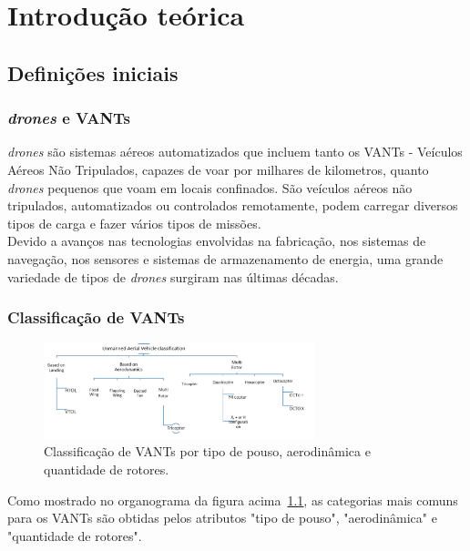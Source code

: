 \documentclass[12pt,a4paper,oneside]{book}
\begin{document}
%

\chapter{Introdução teórica}
%
\thispagestyle{empty} 
%


\section{Definições iniciais}

\subsection{\textit{drones} e VANTs}
\textit{drones} são sistemas aéreos automatizados que incluem tanto os VANTs - Veículos Aéreos Não Tripulados, capazes de voar por milhares de 
kilometros, quanto \textit{drones} pequenos que voam em locais confinados. São veículos aéreos não tripulados, automatizados ou controlados 
remotamente, podem carregar diversos tipos de carga e fazer vários tipos de missões.\\
Devido a avanços nas tecnologias envolvidas na fabricação, nos sistemas de navegação, nos sensores e sistemas de armazenamento de 
energia, uma grande variedade de tipos de \textit{drones} surgiram nas últimas décadas. 

\subsection{Classificação de VANTs}

\begin{figure}[!htbp]
  \centering
  \includegraphics[width=0.7\textwidth]{Images/introducao/drone_classification.png}
  \caption{Classificação de VANTs por tipo de pouso, aerodinâmica e quantidade de rotores.}
  \label{fig:drone_classification.png}
\end{figure}

Como mostrado no organograma da figura acima~\ref{fig:drone_classification.png}, as categorias mais comuns para os VANTs são obtidas pelos atributos "tipo de pouso", "aerodinâmica" e "quantidade de rotores".
\end{document}
